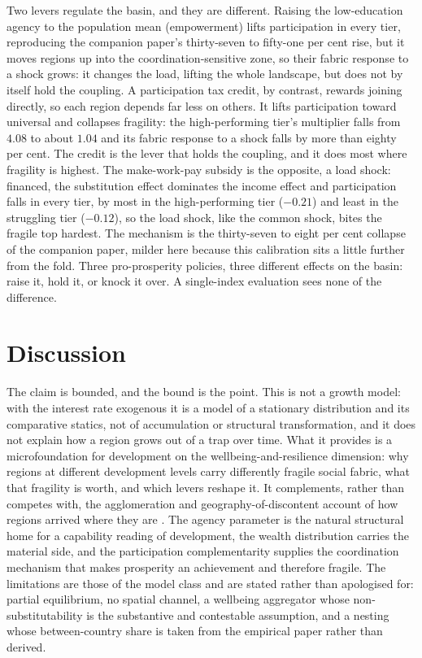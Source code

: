 \documentclass[11pt]{article}
\begin{document}
Two levers regulate the basin, and they are different. Raising the
low-education agency to the population mean (empowerment) lifts
participation in every tier, reproducing the companion paper's thirty-seven
to fifty-one per cent rise, but it moves regions up into the
coordination-sensitive zone, so their fabric response to a shock grows: it
changes the load, lifting the whole landscape, but does not by itself hold
the coupling. A participation tax credit, by contrast, rewards joining
directly, so each region depends far less on others. It lifts participation
toward universal and collapses fragility: the high-performing tier's
multiplier falls from $4.08$ to about $1.04$ and its fabric response to a
shock falls by more than eighty per cent. The credit is the lever that holds
the coupling, and it does most where fragility is highest. The make-work-pay
subsidy is the opposite, a load shock: financed, the substitution effect
dominates the income effect and participation falls in every tier, by most
in the high-performing tier ($-0.21$) and least in the struggling tier
($-0.12$), so the load shock, like the common shock, bites the fragile top
hardest. The mechanism is the thirty-seven to eight per cent collapse of the
companion paper, milder here because this calibration sits a little further
from the fold. Three pro-prosperity policies, three different effects on the basin:
raise it, hold it, or knock it over. A single-index evaluation sees none of
the difference.

\section{Discussion}

The claim is bounded, and the bound is the point. This is not a growth
model: with the interest rate exogenous it is a model of a stationary
distribution and its comparative statics, not of accumulation or structural
transformation, and it does not explain how a region grows out of a trap
over time. What it provides is a microfoundation for development on the
wellbeing-and-resilience dimension: why regions at different development
levels carry differently fragile social fabric, what that fragility is worth,
and which levers reshape it. It complements, rather than competes with, the
agglomeration and geography-of-discontent account of how regions arrived
where they are \citep{rodriguezpose2018}. The agency parameter is the
natural structural home for a capability reading of development, the wealth
distribution carries the material side, and the participation
complementarity supplies the coordination mechanism that makes prosperity an
achievement and therefore fragile. The limitations are those of the model
class and are stated rather than apologised for: partial equilibrium, no
spatial channel, a wellbeing aggregator whose non-substitutability is the
substantive and contestable assumption, and a nesting whose between-country
share is taken from the empirical paper rather than derived.
\end{document}
